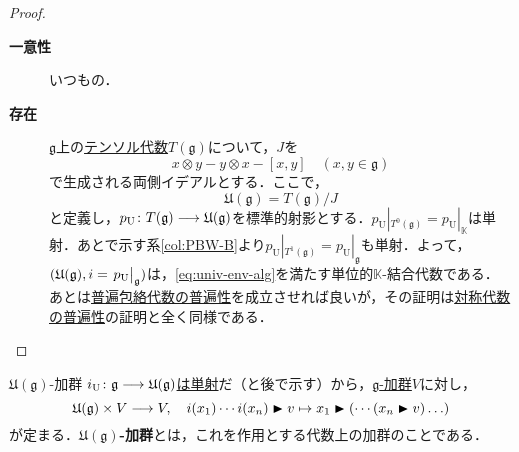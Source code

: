 \documentclass[rep_main]{subfiles}
\begin{document}
\begin{proof}
	\begin{description}
		\item[\textbf{一意性}] いつもの．
		\item[\textbf{存在}] $\mathfrak{g}$上の\hyperref[def:tensor-alg]{テンソル代数}$T(\mathfrak{g})$について，$J$を
		\begin{equation}
			\label{eq:univ-env-alg-J}
			x \otimes y - y \otimes x - [x, y]\quad  (x, y \in \mathfrak{g})
		\end{equation}
		で生成される両側イデアルとする．ここで，
		\begin{equation}
			\mathfrak{U}(\mathfrak{g}) = T(\mathfrak{g}) / J
		\end{equation}
		と定義し，$p_\text{U} \colon T(\mathfrak{g}) \longrightarrow \mathfrak{U}(\mathfrak{g})$を標準的射影とする．$p_\text{U}|_{T^0(\mathfrak{g})} = p_\text{U}|_\mathbb{K}$は単射．あとで示す系\ref{col:PBW-B}より$p_\text{U}|_{T^1(\mathfrak{g})} = p_\text{U}|_\mathfrak{g}$も単射．よって，$(\mathfrak{U}(\mathfrak{g}), i = \eval{p_\text{U}}_\mathfrak{g})$は，\eqref{eq:univ-env-alg}を満たす単位的$\mathbb{K}$-結合代数である．\\
		あとは\hyperref[def:univ-env-alg]{普遍包絡代数の普遍性}を成立させれば良いが，その証明は\hyperref[sym-alg-univ]{対称代数の普遍性}の証明と全く同様である．
	\end{description}
\end{proof}
\begin{mydef}[label=def:univ-env-alg-modular]{$\mathfrak{U}(\mathfrak{g})$-加群}
	\hyperref[col:PBW-C]{$i_\text{U}\colon \mathfrak{g} \longrightarrow \mathfrak{U}(\mathfrak{g})$は単射}だ（と後で示す）から，\hyperref[ax:g-module]{$\mathfrak{g}$-加群}$V$に対し，
	\begin{equation}
		\mathfrak{U}(\mathfrak{g}) \times V \longrightarrow V,\quad  i(x_1) \cdots i(x_n) \blacktriangleright v \mapsto x_1 \blacktriangleright ( \cdots (x_n \blacktriangleright v)\ldots)
	\end{equation}
	が定まる．\textbf{$\mathfrak{U}(\mathfrak{g})$-加群}とは，これを作用とする代数上の加群のことである．
\end{mydef}
\end{document}
